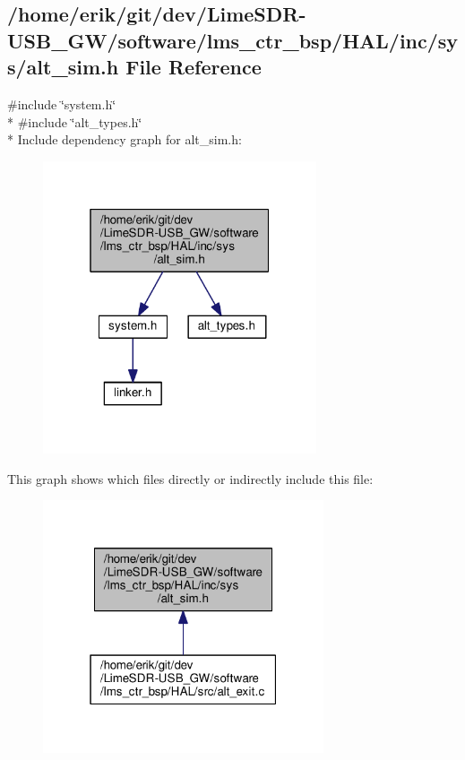 \subsection{/home/erik/git/dev/\+Lime\+S\+D\+R-\/\+U\+S\+B\+\_\+\+G\+W/software/lms\+\_\+ctr\+\_\+bsp/\+H\+A\+L/inc/sys/alt\+\_\+sim.h File Reference}
\label{alt__sim_8h}
{\ttfamily \#include \char`\"{}system.\+h\char`\"{}}\\*
{\ttfamily \#include \char`\"{}alt\+\_\+types.\+h\char`\"{}}\\*
Include dependency graph for alt\+\_\+sim.\+h\+:
\nopagebreak
\begin{figure}[H]
\begin{center}
\leavevmode
\includegraphics[width=229pt]{d5/de7/alt__sim_8h__incl}
\end{center}
\end{figure}
This graph shows which files directly or indirectly include this file\+:
\nopagebreak
\begin{figure}[H]
\begin{center}
\leavevmode
\includegraphics[width=235pt]{dc/dd8/alt__sim_8h__dep__incl}
\end{center}
\end{figure}
